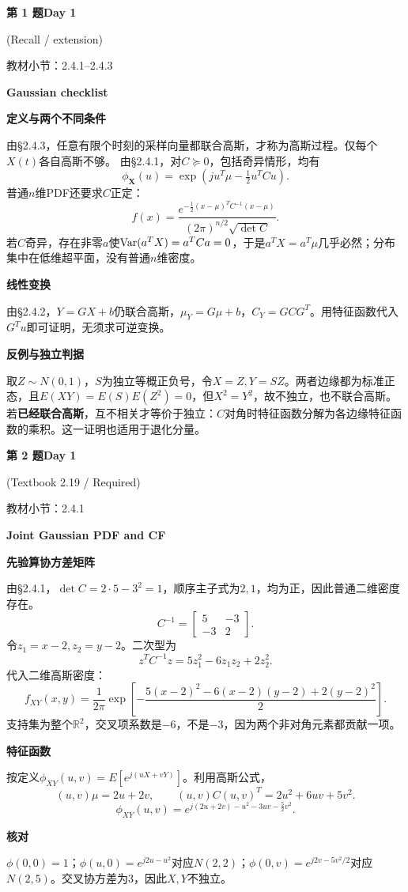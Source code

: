 \documentclass[10.5pt,fontset=fandol]{ctexart}
\newcommand{\key}[1]{\par\vspace{4pt}\noindent\textbf{\color{navy}#1}\par\vspace{2pt}}
\newcommand{\qtitle}[2]{\par\addvspace{1.2em}\Needspace{8\baselineskip}\begin{tcolorbox}[colback=navy,colframe=navy,arc=1.5pt,boxrule=0pt]\color{white}\large\bfseries #1\hfill\small #2\end{tcolorbox}}
\begin{document}
\qtitle{第 1 题}{Day 1}
{\small\color{accentred}(Recall / extension)}\par\smallskip
{\small\color{muted}教材小节：2.4.1--2.4.3}\par\medskip
\noindent\textbf{Gaussian checklist}\par\smallskip\begin{tcolorbox}[breakable,colback=qbg,colframe=qbg,boxrule=0pt]\key{定义与两个不同条件}
由§2.4.3，任意有限个时刻的采样向量都联合高斯，才称为高斯过程。仅每个$X(t)$各自高斯不够。
由§2.4.1，对$C\succeq0$，包括奇异情形，均有
\[\phi_{\boldsymbol X}(u)=\exp(ju^T\mu-\tfrac12u^TCu).\]
普通$n$维PDF还要求$C$正定：
\[f(x)=\frac{e^{-\frac12(x-\mu)^TC^{-1}(x-\mu)}}{(2\pi)^{n/2}\sqrt{\det C}}.\]
若$C$奇异，存在非零$a$使$\operatorname{Var}(a^TX)=a^TCa=0$，于是$a^TX=a^T\mu$几乎必然；分布集中在低维超平面，没有普通$n$维密度。
\key{线性变换}
由§2.4.2，$Y=GX+b$仍联合高斯，$\mu_Y=G\mu+b$，$C_Y=GCG^T$。用特征函数代入$G^Tu$即可证明，无须求可逆变换。
\key{反例与独立判据}
取$Z\sim N(0,1)$，$S$为独立等概正负号，令$X=Z,Y=SZ$。两者边缘都为标准正态，且$E(XY)=E(S)E(Z^2)=0$，但$X^2=Y^2$，故不独立，也不联合高斯。
若\textbf{已经联合高斯}，互不相关才等价于独立：$C$对角时特征函数分解为各边缘特征函数的乘积。这一证明也适用于退化分量。

\end{tcolorbox}
\qtitle{第 2 题}{Day 1}
{\small\color{accentred}(Textbook 2.19 / Required)}\par\smallskip
{\small\color{muted}教材小节：2.4.1}\par\medskip
\noindent\textbf{Joint Gaussian PDF and CF}\par\smallskip\begin{tcolorbox}[breakable,colback=qbg,colframe=qbg,boxrule=0pt]\key{先验算协方差矩阵}
由§2.4.1，$\det C=2\cdot5-3^2=1$，顺序主子式为$2,1$，均为正，因此普通二维密度存在。
\[C^{-1}=\begin{bmatrix}5&-3\\-3&2\end{bmatrix}.\]
令$z_1=x-2,z_2=y-2$。二次型为
\[z^TC^{-1}z=5z_1^2-6z_1z_2+2z_2^2.\]
代入二维高斯密度：
\[\boxed{f_{XY}(x,y)=\frac1{2\pi}\exp\!\left[-\frac{5(x-2)^2-6(x-2)(y-2)+2(y-2)^2}{2}\right].}\]
支持集为整个$\mathbb R^2$，交叉项系数是$-6$，不是$-3$，因为两个非对角元素都贡献一项。
\key{特征函数}
按定义$\phi_{XY}(u,v)=E[e^{j(uX+vY)}]$。利用高斯公式，
\[(u,v)\mu=2u+2v,\qquad (u,v)C(u,v)^T=2u^2+6uv+5v^2.\]
\[\boxed{\phi_{XY}(u,v)=e^{j(2u+2v)-u^2-3uv-\frac52v^2}.}\]
\key{核对}
$\phi(0,0)=1$；$\phi(u,0)=e^{j2u-u^2}$对应$N(2,2)$；$\phi(0,v)=e^{j2v-5v^2/2}$对应$N(2,5)$。交叉协方差为3，因此$X,Y$不独立。

\end{tcolorbox}
\end{document}
